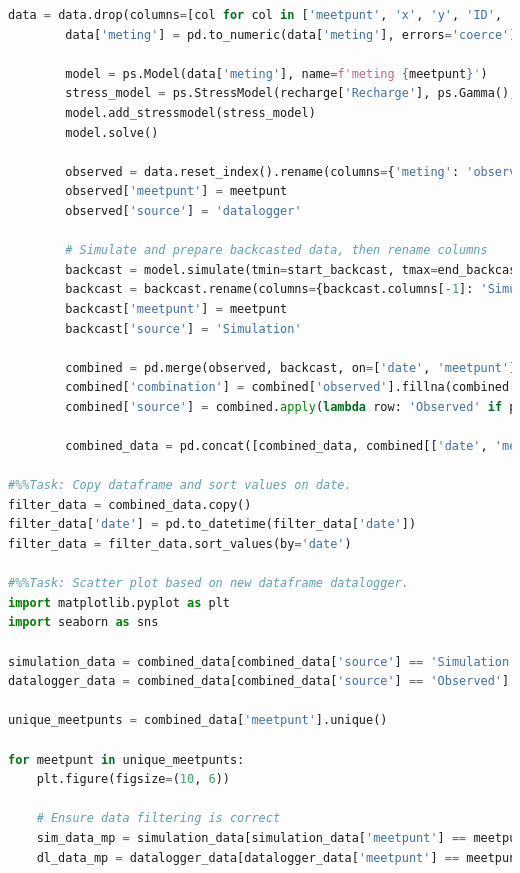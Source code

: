 \begin{lstlisting}[language=Python]
        data = data.drop(columns=[col for col in ['meetpunt', 'x', 'y', 'ID', 'meethoogte', 'waarneming'] if col in data.columns])
        data['meting'] = pd.to_numeric(data['meting'], errors='coerce')

        model = ps.Model(data['meting'], name=f'meting {meetpunt}')
        stress_model = ps.StressModel(recharge['Recharge'], ps.Gamma(), name='recharge', settings='evap')
        model.add_stressmodel(stress_model)
        model.solve()

        observed = data.reset_index().rename(columns={'meting': 'observed'})
        observed['meetpunt'] = meetpunt
        observed['source'] = 'datalogger'

        # Simulate and prepare backcasted data, then rename columns
        backcast = model.simulate(tmin=start_backcast, tmax=end_backcast).reset_index()
        backcast = backcast.rename(columns={backcast.columns[-1]: 'Simulation', 'index': 'date'})
        backcast['meetpunt'] = meetpunt
        backcast['source'] = 'Simulation'

        combined = pd.merge(observed, backcast, on=['date', 'meetpunt'], how='outer')
        combined['combination'] = combined['observed'].fillna(combined['Simulation'])
        combined['source'] = combined.apply(lambda row: 'Observed' if pd.notnull(row['observed']) else 'Simulation', axis=1)

        combined_data = pd.concat([combined_data, combined[['date', 'meetpunt', 'combination', 'source']]], ignore_index=True)

#%%Task: Copy dataframe and sort values on date. 
filter_data = combined_data.copy()
filter_data['date'] = pd.to_datetime(filter_data['date'])
filter_data = filter_data.sort_values(by='date')

#%%Task: Scatter plot based on new dataframe datalogger.
import matplotlib.pyplot as plt
import seaborn as sns

simulation_data = combined_data[combined_data['source'] == 'Simulation']
datalogger_data = combined_data[combined_data['source'] == 'Observed']

unique_meetpunts = combined_data['meetpunt'].unique()

for meetpunt in unique_meetpunts:
    plt.figure(figsize=(10, 6))  

    # Ensure data filtering is correct
    sim_data_mp = simulation_data[simulation_data['meetpunt'] == meetpunt]
    dl_data_mp = datalogger_data[datalogger_data['meetpunt'] == meetpunt]


\end{lstlisting}
